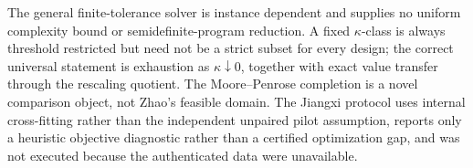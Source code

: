 The general finite-tolerance solver is instance dependent and supplies no uniform complexity bound or semidefinite-program reduction.  A fixed \(\kappa\)-class is always threshold restricted but need not be a strict subset for every design; the correct universal statement is exhaustion as \(\kappa\downarrow0\), together with exact value transfer through the rescaling quotient.  The Moore--Penrose completion is a novel comparison object, not Zhao's feasible domain.  The Jiangxi protocol uses internal cross-fitting rather than the independent unpaired pilot assumption, reports only a heuristic objective diagnostic rather than a certified optimization gap, and was not executed because the authenticated data were unavailable.